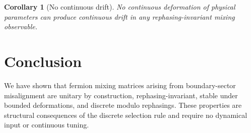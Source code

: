 ﻿\documentclass[12pt]{article}
\newtheorem{corollary}[theorem]{Corollary}
\theoremstyle{definition}
\theoremstyle{remark}
\begin{document}
\begin{corollary}[No continuous drift]\label{cor:nodrift}
No continuous deformation of physical parameters can produce continuous
drift in any rephasing-invariant mixing observable.
\end{corollary}

\section{Conclusion}

We have shown that fermion mixing matrices arising from boundary-sector
misalignment are unitary by construction, rephasing-invariant, stable under
bounded deformations, and discrete modulo rephasings. These properties are
structural consequences of the discrete selection rule and require no
dynamical input or continuous tuning.



\end{document}
